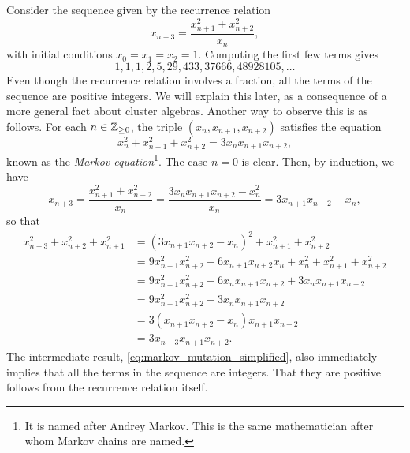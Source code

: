\begin{example}\label{exmp:markov_sequence}
	Consider the sequence given by the recurrence relation
	\begin{equation*}
		x_{n+3} = \frac{x_{n+1}^2 + x_{n+2}^2}{x_n},
	\end{equation*}
	with initial conditions $x_0 = x_1 = x_2 = 1$. Computing the first few terms gives
	\begin{equation*}
		1,1,1,2,5,29,433,37666,48928105,\dots
	\end{equation*}
	Even though the recurrence relation involves a fraction, all the terms of the sequence
	are positive integers. We will explain this later, as a consequence of a more general
	fact about cluster algebras. Another way to observe this is as follows. For each $n \in
		\mathbb{Z}_{\geq0}$, the triple $(x_n, x_{n+1}, x_{n+2})$ satisfies the equation
	\begin{equation}\label{eq:markov_diophantine}
		x_n^2 + x_{n+1}^2 + x_{n+2}^2 = 3 x_n x_{n+1}x_{n+2},
	\end{equation}
	known as the \emph{Markov equation}\footnote{It is named after Andrey Markov. This is the same mathematician after whom Markov chains are named.}. The case $n = 0$ is clear. Then, by induction, we have
	\begin{equation}\label{eq:markov_mutation_simplified}
		x_{n+3} = \frac{x_{n+1}^2 + x_{n+2}^2}{x_n} = \frac{3 x_n x_{n+1}x_{n+2} - x_n^2}{x_n} = 3 x_{n+1} x_{n+2} - x_n,
	\end{equation}
	so that
	\begin{align*}
		x_{n+3}^2 + x_{n+2}^2 + x_{n+1}^2
		 & = (3 x_{n+1}x_{n+2} - x_n)^2 + x_{n+1}^2 + x_{n+2}^2                            \\
		 & = 9 x_{n+1}^2 x_{n+2}^2 - 6 x_{n+1} x_{n+2} x_n + x_n^2 + x_{n+1}^2 + x_{n+2}^2 \\
		 & = 9 x_{n+1}^2 x_{n+2}^2 - 6 x_n x_{n+1} x_{n+2} + 3 x_n x_{n+1} x_{n+2}         \\
		 & = 9 x_{n+1}^2 x_{n+2}^2 - 3 x_n x_{n+1} x_{n+2}                                 \\
		 & = 3 ( x_{n+1} x_{n+2}-  x_n) x_{n+1} x_{n+2}                                    \\
		 & = 3 x_{n+3} x_{n+1} x_{n+2}.
	\end{align*}
	The intermediate result, \cref{eq:markov_mutation_simplified}, also immediately implies
	that all the terms in the sequence are integers. That they are positive follows from
	the recurrence relation itself.
\end{example}

